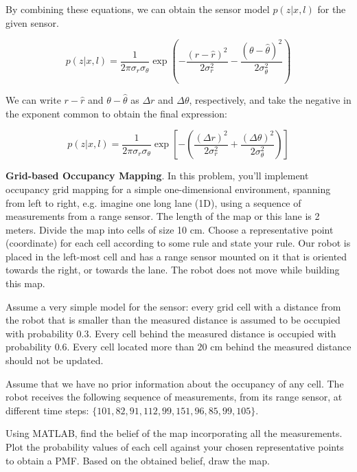 \documentclass[answers]{exam}
\begin{document}
\begin{questions}
\begin{solution}
        By combining these equations, we can obtain the sensor model $p(z|x, l)$ for
        the given sensor.

        \[
            p(z | x, l) = \frac{1}{2\pi\sigma_r\sigma_\theta} \exp\left(-\frac{(r - \hat{r})^2}{2\sigma_r^2} - \frac{(\theta - \hat{\theta})^2}{2\sigma_\theta^2}\right)
        \]

        We can write $r - \hat{r}$ and $\theta - \hat{\theta}$ as $\Delta r$ and
        $\Delta \theta$, respectively, and take the negative in the exponent
        common to obtain the final expression:

        \[
            p(z | x, l) = \frac{1}{2\pi\sigma_r\sigma_\theta} \exp\left[- \left(\frac{(\Delta r)^2}{2\sigma_r^2} + \frac{(\Delta \theta)^2}{2\sigma_\theta^2}\right)\right]
        \]
    \end{solution}

    \question[25]
    \textbf{Grid-based Occupancy Mapping}. In this problem, you'll implement occupancy grid mapping
    for a simple one-dimensional environment, spanning from left to right, e.g. imagine one long
    lane (1D), using a sequence of measurements from a range sensor. The length of the map or
    this lane is 2 meters. Divide the map into cells of size 10 cm. Choose a representative point
    (coordinate) for each cell according to some rule and state your rule. Our robot is placed in
    the left-most cell and has a range sensor mounted on it that is oriented towards the right, or
    towards the lane. The robot does not move while building this map.

    Assume a very simple model for the sensor: every grid cell with a distance from
    the robot that is smaller than the measured distance is assumed to be occupied
    with probability $0.3$. Every cell behind the measured distance is occupied
    with probability $0.6$. Every cell located more than $20$ cm behind the
    measured distance should not be updated.

    Assume that we have no prior information about the occupancy of any cell. The
    robot receives the following sequence of measurements, from its range sensor,
    at different time steps: $\{101, 82, 91, 112, 99, 151, 96, 85, 99, 105\}$.

    Using MATLAB, find the belief of the map incorporating all the measurements.
    Plot the probability values of each cell against your chosen representative
    points to obtain a PMF. Based on the obtained belief, draw the map.


\end{questions}
\end{document}
